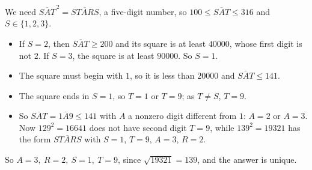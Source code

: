 We need $\overline{SAT}^{\,2}=\overline{STARS}$, a five-digit number, so $100\le\overline{SAT}\le316$ and $S\in\{1,2,3\}$.
\begin{itemize}
\item If $S=2$, then $\overline{SAT}\ge200$ and its square is at least $40000$, whose first digit is not $2$. If $S=3$, the square is at least $90000$. So $S=1$.
\item The square must begin with $1$, so it is less than $20000$ and $\overline{SAT}\le141$.
\item The square ends in $S=1$, so $T=1$ or $T=9$; as $T\ne S$, $T=9$.
\item So $\overline{SAT}=\overline{1A9}\le141$ with $A$ a nonzero digit different from $1$: $A=2$ or $A=3$. Now $129^2=16641$ does not have second digit $T=9$, while $139^2=19321$ has the form $\overline{STARS}$ with $S=1$, $T=9$, $A=3$, $R=2$.
\end{itemize}
So $\boxed{A=3,\ R=2,\ S=1,\ T=9}$, since $\sqrt{19321}=139$, and the answer is unique.
